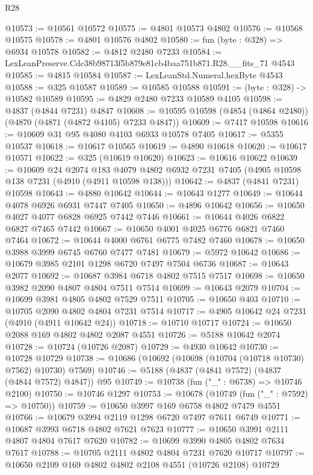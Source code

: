 \begin{lexlean}{R28}
\begin{coremodule}
@10573 := @10561 @10572
@10575 := @4801 @10573 @4802
@10576 := @10568 @10575
@10578 := @4801 @10576 @4802
@10580 := fun (byte : @328) => @6934 @10578
@10582 := @4812 @2480 @7233
@10584 := LexLeanPreserve.Cdc38b98713f5b879e81cb4baa751b871.R28.__fits_71 @4543
@10585 := @4815 @10584
@10587 := LexLeanStd.Numeral.hexByte @4543
@10588 := @325 @10587
@10589 := @10585 @10588
@10591 := (byte : @328) -> @10582 @10589
@10595 := @4829 @2480 @7233 @10589 @4105
@10598 := @4837 (@4844 @7231) @4847
@10608 := @10595 @10598 (@4854 (@4864 @2480)) (@4870 (@4871 (@4872 @4105) @7233 @4847))
@10609 := @7417 @10598
@10616 := @10609 @31 @95 @4080 @4103 @6933 @10578 @7405
@10617 := @5355 @10537
@10618 := @10617 @10565
@10619 := @4890 @10618
@10620 := @10617 @10571
@10622 := @325 (@10619 @10620)
@10623 := @10616 @10622
@10639 := @10609
    @24
    @2074
    @183
    @4079
    @4802
    @6932
    @7231
    @7405
    (@4905 @10598 @138 @7231 (@4910 (@4911 @10598 @138)))
@10642 := @4837 (@4841 @7231) @10598
@10643 := @4880 @10642
@10644 := @10643 @1277
@10649 := @10644 @4078 @6926 @6931 @7447 @7405
@10650 := @4896 @10642
@10656 := @10650 @4027 @4077 @6828 @6925 @7442 @7446
@10661 := @10644 @4026 @6822 @6827 @7465 @7442
@10667 := @10650 @4001 @4025 @6776 @6821 @7460 @7464
@10672 := @10644 @4000 @6761 @6775 @7482 @7460
@10678 := @10650 @3988 @3999 @6745 @6760 @7477 @7481
@10679 := @5972 @10642
@10686 := @10679 @3985 @2101 @1298 @6720 @7497 @7504 @6736
@10687 := @10643 @2077
@10692 := @10687 @3984 @6718 @4802 @7515 @7517
@10698 := @10650 @3982 @2090 @4807 @4804 @7511 @7514
@10699 := @10643 @2079
@10704 := @10699 @3981 @4805 @4802 @7529 @7511
@10705 := @10650 @403
@10710 := @10705 @2090 @4802 @4804 @7231 @7514
@10717 := @4905 @10642 @24 @7231 (@4910 (@4911 @10642 @24))
@10718 := @10710 @10717
@10724 := @10650 @2088 @169 @4802 @4802 @2087 @4551
@10726 := @5188 @10642 @2074
@10728 := @10724 (@10726 @2087)
@10729 := @4930 @10642
@10730 := @10728 @10729
@10738 := @10686 (@10692 (@10698 (@10704 (@10718 @10730) @7562) @10730) @7569)
@10746 := @5188 (@4837 (@4841 @7572) (@4837 (@4844 @7572) @4847)) @95
@10749 := @10738 (fun ("_" : @6738) => @10746 @2100)
@10750 := @10746 @1297
@10753 := @10678 (@10749 (fun ("_" : @7592) => @10750))
@10759 := @10650 @3997 @169 @6758 @4802 @7479 @4551
@10766 := @10679 @3994 @2119 @1298 @6720 @7497 @7611 @6749
@10771 := @10687 @3993 @6718 @4802 @7621 @7623
@10777 := @10650 @3991 @2111 @4807 @4804 @7617 @7620
@10782 := @10699 @3990 @4805 @4802 @7634 @7617
@10788 := @10705 @2111 @4802 @4804 @7231 @7620 @10717
@10797 := @10650 @2109 @169 @4802 @4802 @2108 @4551 (@10726 @2108) @10729

\end{coremodule}
\end{lexlean}
